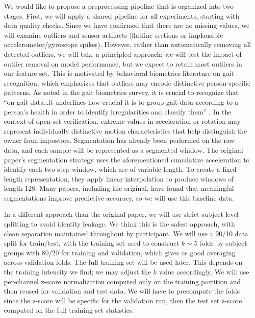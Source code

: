 We would like to propose a preprocessing pipeline that is organized into two stages. First, we will apply a shared pipeline for all experiments, starting with data quality checks. Since we have confirmed that there are no missing values, we will examine outliers and sensor artifacts (flatline sections or implausible accelerometer/gyroscope spikes). However, rather than automatically removing all detected outliers, we will take a principled approach: we will test the impact of outlier removal on model performance, but we expect to retain most outliers in our feature set. This is motivated by behavioral biometrics literature on gait recognition, which emphasizes that outliers may encode distinctive person-specific patterns. As noted in the gait biometrics survey, it is crucial to recognize that ``on gait data\ldots it underlines how crucial it is to group gait data according to a person's health in order to identify irregularities and classify them'' \cite{kulshreshtha2024survey}. In the context of open-set verification, extreme values in acceleration or rotation may represent individually distinctive motion characteristics that help distinguish the owner from impostors. Segmentation has already been performed on the raw data, and each sample will be represented as a segmented window. The original paper's segmentation strategy uses the aforementioned cumulative acceleration to identify each two-step window, which are of variable length. To create a fixed-length representation, they apply linear interpolation to produce windows of length 128. Many papers, including the original, have found that meaningful segmentations improve predictive accuracy, so we will use this baseline data.

In a different approach than the original paper, we will use strict subject-level splitting to avoid identity leakage. We think this is the safest approach, with clean separation maintained throughout by participant. We will use a 90/10 data split for train/test, with the training set used to construct $k\sim5$ folds by subject groups with 80/20 for training and validation, which gives us good averaging across validation folds. The full training set will be used later. This depends on the training intensity we find; we may adjust the $k$ value accordingly. We will use per-channel z-score normalization computed only on the training partition and then reused for validation and test data. We will have to precompute the folds since the z-score will be specific for the validation run, then the test set z-score computed on the full training set statistics.

